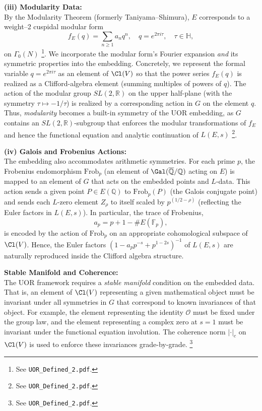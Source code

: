 \documentclass[11pt]{article}
\begin{document}
\bigskip

\textbf{(iii) Modularity Data:} \\
By the Modularity Theorem (formerly Taniyama--Shimura), \(E\) corresponds to a weight--2 cuspidal modular form 
\[
f_E(q)=\sum_{n\ge1}a_n q^n,\quad q=e^{2\pi i \tau},\quad \tau\in \mathbb{H},
\]
on \(\Gamma_0(N)\) 
\footnote{See \texttt{UOR\_Defined\_2.pdf}.}. We incorporate the modular form’s Fourier expansion \emph{and} its symmetric properties into the embedding. Concretely, we represent the formal variable \(q=e^{2\pi i\tau}\) as an element of \(\Cl(V)\) so that the power series \(f_E(q)\) is realized as a Clifford-algebra element (summing multiples of powers of \(q\)). The action of the modular group \(SL(2,\mathbb{R})\) on the upper half-plane (with the symmetry \(\tau\mapsto -1/\tau\)) is realized by a corresponding action in \(G\) on the element \(q\). Thus, \emph{modularity} becomes a built-in symmetry of the UOR embedding, as \(G\) contains an \(SL(2,\mathbb{R})\)-subgroup that enforces the modular transformations of \(f_E\) and hence the functional equation and analytic continuation of \(L(E,s)\) 
\footnote{See \texttt{UOR\_Defined\_2.pdf}.}.

\bigskip

\textbf{(iv) Galois and Frobenius Actions:} \\
The embedding also accommodates arithmetic symmetries. For each prime \(p\), the Frobenius endomorphism \(\mathrm{Frob}_p\) (an element of \(\Gal(\overline{\mathbb{Q}}/\mathbb{Q})\) acting on \(E\)) is mapped to an element of \(G\) that acts on the embedded points and \(L\)-data. This action sends a given point \(P\in E(\mathbb{Q})\) to \(\mathrm{Frob}_p(P)\) (the Galois conjugate point) and sends each \(L\)-zero element \(Z_\rho\) to itself scaled by \(p^{(1/2-\rho)}\) (reflecting the Euler factors in \(L(E,s)\)). In particular, the trace of Frobenius,
\[
a_p = p+1-\#E(\mathbb{F}_p),
\]
is encoded by the action of \(\mathrm{Frob}_p\) on an appropriate cohomological subspace of \(\Cl(V)\). Hence, the Euler factors \((1 - a_p p^{-s} + p^{1-2s})^{-1}\) of \(L(E,s)\) are naturally reproduced inside the Clifford algebra structure.

\bigskip

\textbf{Stable Manifold and Coherence:} \\
The UOR framework requires a \emph{stable manifold} condition on the embedded data. That is, an element of \(\Cl(V)\) representing a given mathematical object must be invariant under all symmetries in \(G\) that correspond to known invariances of that object. For example, the element representing the identity \(\mathcal{O}\) must be fixed under the group law, and the element representing a complex zero at \(s=1\) must be invariant under the functional equation involution. The coherence norm \( |\cdot|_c \) on \(\Cl(V)\) is used to enforce these invariances grade-by-grade.
\footnote{See \texttt{UOR\_Defined\_2.pdf}.}
\end{document}
